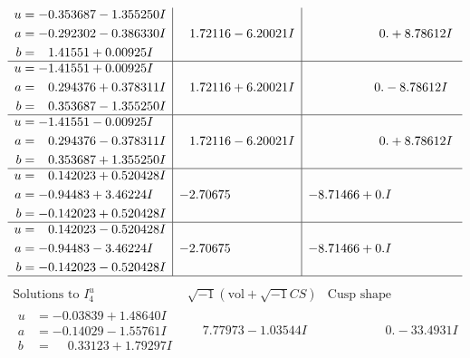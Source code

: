 \documentclass[1p]{elsarticle_modified}
\theoremstyle{definition}
\newcommand{\I}{\sqrt{-1}}
\begin{document}
$$\begin{array}{c|c|c}
\begin{aligned}
u &= -0.353687 - 1.355250 I \\
a &= -0.292302 - 0.386330 I \\
b &= \phantom{-}1.41551 + 0.00925 I\end{aligned}
 & \phantom{-}1.72116 - 6.20021 I & \phantom{-0.000000 -}0. + 8.78612 I \\ \hline\begin{aligned}
u &= -1.41551 + 0.00925 I \\
a &= \phantom{-}0.294376 + 0.378311 I \\
b &= \phantom{-}0.353687 - 1.355250 I\end{aligned}
 & \phantom{-}1.72116 + 6.20021 I & \phantom{-0.000000 } 0. - 8.78612 I \\ \hline\begin{aligned}
u &= -1.41551 - 0.00925 I \\
a &= \phantom{-}0.294376 - 0.378311 I \\
b &= \phantom{-}0.353687 + 1.355250 I\end{aligned}
 & \phantom{-}1.72116 - 6.20021 I & \phantom{-0.000000 -}0. + 8.78612 I \\ \hline\begin{aligned}
u &= \phantom{-}0.142023 + 0.520428 I \\
a &= -0.94483 + 3.46224 I \\
b &= -0.142023 + 0.520428 I\end{aligned}
 & -2.70675\phantom{ +0.000000I} & -8.71466 + 0. I\phantom{ +0.000000I} \\ \hline\begin{aligned}
u &= \phantom{-}0.142023 - 0.520428 I \\
a &= -0.94483 - 3.46224 I \\
b &= -0.142023 - 0.520428 I\end{aligned}
 & -2.70675\phantom{ +0.000000I} & -8.71466 + 0. I\phantom{ +0.000000I}\\
 \hline 
 \end{array}$$\newpage$$\begin{array}{c|c|c}  
\text{Solutions to }I^u_{4}& \I (\text{vol} + \sqrt{-1}CS) & \text{Cusp shape}\\
 \hline 
\begin{aligned}
u &= -0.03839 + 1.48640 I \\
a &= -0.14029 - 1.55761 I \\
b &= \phantom{-}0.33123 + 1.79297 I\end{aligned}
 & \phantom{-}7.77973 - 1.03544 I & \phantom{-0.000000 } 0. - 33.4931 I \\ \hline\begin{aligned}

\end{aligned}
\end{array}$$
\end{document}
